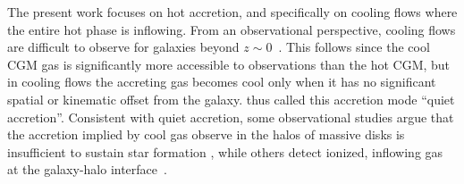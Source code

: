 \documentclass[fleqn,usenatbib]{mnras}
\begin{document}


The present work focuses on hot accretion, and specifically on cooling flows where the entire hot phase is inflowing.  
From an observational perspective, cooling flows are difficult to observe for galaxies beyond
$z\sim0$~\citep{Putman2012}.
This follows since the cool CGM gas is significantly more accessible to observations than the hot CGM, but in cooling flows the accreting gas becomes cool only when it has no significant spatial or kinematic offset from the galaxy.
\citeauthor{Putman2012} thus called this accretion mode ``quiet accretion''. 
Consistent with quiet accretion, some observational studies argue that the accretion implied by cool gas observe in the halos of massive disks is insufficient to sustain star formation \citep{Binney09}, while others detect ionized, inflowing gas at the galaxy-halo interface~\citep{Zheng2017}. 


\end{document}
